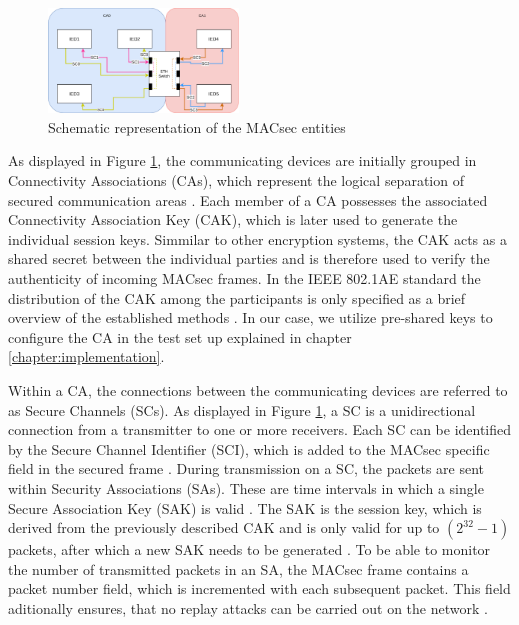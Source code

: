 \documentclass[conference]{IEEEtran}
\begin{document}
\begin{figure}[h]
    \centering
    \includegraphics[width=0.45\textwidth]{images/MACsec_Entities_Diagram.png}
    \caption{Schematic representation of the MACsec entities \cite{IEEE-802-1AE:2018}}
    \label{image:MACsecEntities}
\end{figure}

As displayed in Figure \ref{image:MACsecEntities}, the communicating devices are initially grouped in Connectivity Associations (CAs), which represent 
the logical separation of secured communication areas \cite[p. 35]{IEEE-802-1AE:2018}. Each member of a CA possesses the associated Connectivity 
Association Key (CAK), which is later used to generate the individual session keys. Simmilar to other encryption systems, the CAK acts as a shared 
secret between the individual parties and is therefore used to verify the authenticity of incoming MACsec frames. In the IEEE 802.1AE standard the 
distribution of the CAK among the participants is only specified as a brief overview of the established methods \cite[p. 230]{IEEE-802-1AE:2018}. 
In our case, we utilize pre-shared keys to configure the CA in the test set up explained in chapter \ref{chapter:implementation}.

\smallskip
Within a CA, the connections between the communicating devices are referred to as Secure Channels (SCs). As displayed in Figure \ref{image:MACsecEntities}, 
a SC is a unidirectional connection from a transmitter to one or more receivers. Each SC can be identified by the Secure Channel Identifier (SCI), 
which is added to the MACsec specific field in the secured frame \cite[p. 43]{IEEE-802-1AE:2018}. During transmission on a SC, the packets are sent 
within Security Associations (SAs). These are time intervals in which a single Secure Association Key (SAK) is valid \cite[p. 44]{IEEE-802-1AE:2018}. 
The SAK is the session key, which is derived from the previously described CAK and is only valid for up to ${(2^{32} -1)}$ packets, after which a new 
SAK needs to be generated \cite[p. 66]{IEEE-802-1AE:2018}. To be able to monitor the number of transmitted packets in an SA, the MACsec frame contains 
a packet number field, which is incremented with each subsequent packet. This field aditionally ensures, that no replay attacks can be carried out on 
the network \cite[p. 145]{IEEE-802-1AE:2018}. 
\end{document}
